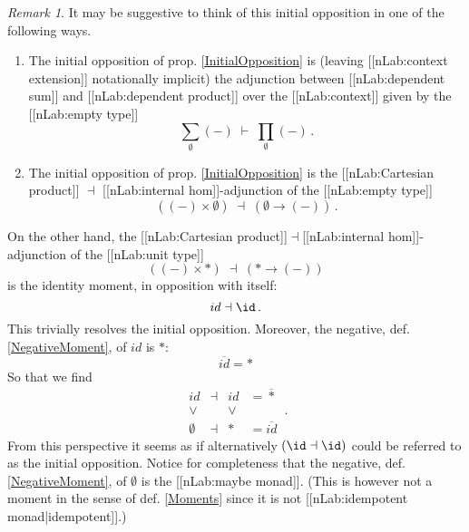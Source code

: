 \documentclass[12pt,titlepage]{article}
\newcommand{\itexarray}[1]{\begin{matrix}#1\end{matrix}}
\theoremstyle{plain}
\theoremstyle{definition}
\theoremstyle{remark}
\newtheorem{remark}{Remark}
\begin{document}
\begin{remark}
\label{AspectsOfTheInitialOpposition}\hypertarget{AspectsOfTheInitialOpposition}{}
It may be suggestive to think of this initial opposition in one of the following ways.
\begin{enumerate}%
\item The initial opposition of prop. \ref{InitialOpposition} is (leaving [[nLab:context extension]] notationally implicit) the adjunction between [[nLab:dependent sum]] and [[nLab:dependent product]] over the [[nLab:context]] given by the [[nLab:empty type]]
\begin{displaymath}
\underset{\emptyset}{\sum}(-)
  \;\vdash\;
  \underset{\emptyset}{\prod}(-)
  \,.
\end{displaymath}
\item The initial opposition of prop. \ref{InitialOpposition} is the [[nLab:Cartesian product]] $\dashv$ [[nLab:internal hom]]-adjunction of the [[nLab:empty type]]
\begin{displaymath}
\left(
     (-) \times \emptyset
   \right)
   \;\dashv\;
   \left(
     \emptyset \to (-)
   \right)
   \,.
\end{displaymath}
\end{enumerate}
On the other hand, the [[nLab:Cartesian product]]$\dashv$[[nLab:internal hom]]-adjunction of the [[nLab:unit type]]
\begin{displaymath}
\left(
     (-) \times \ast
   \right)
   \;\dashv\;
   \left(
     \ast \to (-)
   \right)
\end{displaymath}
is the identity moment, in opposition with itself:
\begin{displaymath}
id \dashv \id
  \,.
\end{displaymath}
This trivially resolves the initial opposition. Moreover, the negative, def. \ref{NegativeMoment}, of $id$ is $\ast$:
\begin{displaymath}
\overline{id} = \ast
\end{displaymath}
So that we find
\begin{displaymath}
\itexarray{
    id &\dashv& id & = \overline{\ast}
    \\
    \vee && \vee
    \\
    \emptyset &\dashv& \ast & = \overline{id}
  }
  \,.
\end{displaymath}
From this perspective it seems as if alternatively $(\id \dashv \id)$ could be referred to as the initial opposition.
Notice for completeness that the negative, def. \ref{NegativeMoment}, of $\emptyset$ is the [[nLab:maybe monad]]. (This is however not a moment in the sense of def. \ref{Moments} since it is not [[nLab:idempotent monad|idempotent]].)
\end{remark}
\end{document}
